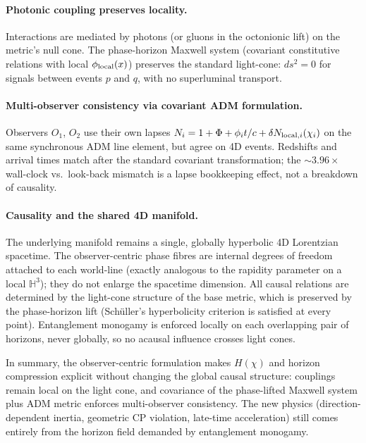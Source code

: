 \documentclass[12pt,a4paper]{article}
\begin{document}
\paragraph{Photonic coupling preserves locality.}
Interactions are mediated by photons (or gluons in the octonionic lift) on the metric's null cone. The phase-horizon Maxwell system (covariant constitutive relations with local \(\phi_{\rm local}(x)\)) preserves the standard light-cone: \(ds^2=0\) for signals between events \(p\) and \(q\), with no superluminal transport.

\paragraph{Multi-observer consistency via covariant ADM formulation.}
Observers \(O_1\), \(O_2\) use their own lapses \(N_i = 1 + \Phi + \phi_i t/c + \delta N_{{\rm local},i}(\chi_i)\) on the same synchronous ADM line element, but agree on 4D events. Redshifts and arrival times match after the standard covariant transformation; the \(\sim3.96\times\) wall-clock vs.\ look-back mismatch is a lapse bookkeeping effect, not a breakdown of causality.

\paragraph{Causality and the shared 4D manifold.}
The underlying manifold remains a single, globally hyperbolic 4D Lorentzian spacetime. The observer-centric phase fibres are internal degrees of freedom attached to each world-line (exactly analogous to the rapidity parameter on a local \(\mathbb{H}^3\)); they do not enlarge the spacetime dimension. All causal relations are determined by the light-cone structure of the base metric, which is preserved by the phase-horizon lift (Schüller's hyperbolicity criterion is satisfied at every point). Entanglement monogamy is enforced locally on each overlapping pair of horizons, never globally, so no acausal influence crosses light cones.

In summary, the observer-centric formulation makes \(H(\chi)\) and horizon compression explicit without changing the global causal structure: couplings remain local on the light cone, and covariance of the phase-lifted Maxwell system plus ADM metric enforces multi-observer consistency. The new physics (direction-dependent inertia, geometric CP violation, late-time acceleration) still comes entirely from the horizon field demanded by entanglement monogamy.
\end{document}
